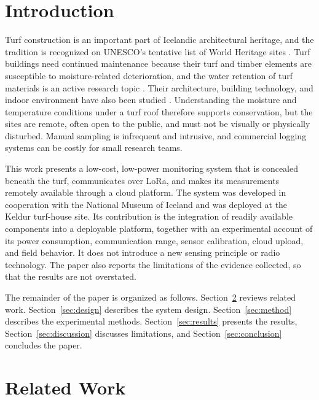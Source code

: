 \documentclass[conference]{IEEEtran}
\begin{document}
\section{Introduction}
Turf construction is an important part of Icelandic architectural heritage, and the tradition is recognized on UNESCO's tentative list of World Heritage sites \cite{unesco2011turf}. Turf buildings need continued maintenance because their turf and timber elements are susceptible to moisture-related deterioration, and the water retention of turf materials is an active research topic \cite{lin2023turf}. Their architecture, building technology, and indoor environment have also been studied \cite{vanhoof2008turf}. Understanding the moisture and temperature conditions under a turf roof therefore supports conservation, but the sites are remote, often open to the public, and must not be visually or physically disturbed. Manual sampling is infrequent and intrusive, and commercial logging systems can be costly for small research teams.

This work presents a low-cost, low-power monitoring system that is concealed beneath the turf, communicates over LoRa, and makes its measurements remotely available through a cloud platform. The system was developed in cooperation with the National Museum of Iceland and was deployed at the Keldur turf-house site. Its contribution is the integration of readily available components into a deployable platform, together with an experimental account of its power consumption, communication range, sensor calibration, cloud upload, and field behavior. It does not introduce a new sensing principle or radio technology. The paper also reports the limitations of the evidence collected, so that the results are not overstated.

The remainder of the paper is organized as follows. Section~\ref{sec:related} reviews related work. Section~\ref{sec:design} describes the system design. Section~\ref{sec:method} describes the experimental methods. Section~\ref{sec:results} presents the results, Section~\ref{sec:discussion} discusses limitations, and Section~\ref{sec:conclusion} concludes the paper.

\section{Related Work}\label{sec:related}
\end{document}
